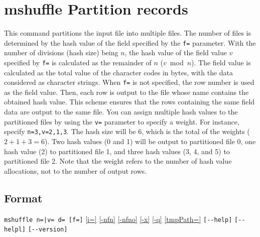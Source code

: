 
%

\section{mshuffle Partition records\label{sect:mshuffle}}
This command partitions the input file into multiple files. The number of files is determined by the hash value of the field specified by the \verb|f=| parameter. With the number of divisions (hash size) being $n$, the hash value of the field value $v$ specified by \verb|f=| is calculated as the remainder of $n$ ($v$\ mod\ $n$). The field value is calculated as the total value of the character codes in bytes, with the data considered as character strings. When \verb|f=| is not specified, the row number is used as the field value. Then, each row is output to the file whose name contains the obtained hash value. This scheme ensures that the rows containing the same field data are output to the same file. 
You can assign multiple hash values to the partitioned files by using the \verb|v=| parameter to specify a weight. For instance, specify \verb|n=3,v=2,1,3|. The hash size will be $6$, which is the total of the weights ($2+1+3=6$). Two hash values (0 and 1) will be output to partitioned file 0, one hash value (2) to partitioned file 1, and three hash values (3, 4, and 5) to partitioned file 2. Note that the weight refers to the number of hash value allocations, not to the number of output rows.

\subsection*{Format}
\verb/mshuffle n=|v= d= [f=]/
\hyperref[sect:option_i]{[i=]}
\hyperref[sect:option_nfn]{[-nfn]} 
\hyperref[sect:option_nfno]{[-nfno]}  
\hyperref[sect:option_x]{[-x]}
\hyperref[sect:option_q]{[-q]}
\hyperref[sect:option_tmpPath]{[tmpPath=]} 
\verb|[--help]|
\verb|[--helpl]|
\verb|[--version]|\\


